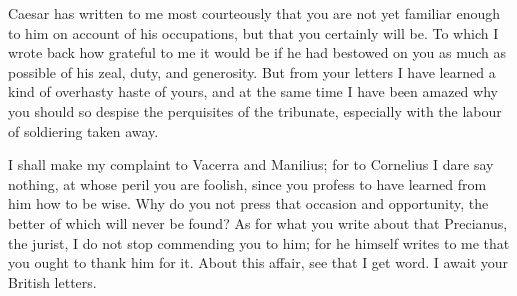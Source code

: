 

 Caesar has written to me most courteously that you are not yet familiar enough to him on account of his occupations, but that you certainly will be. To which I wrote back how grateful to me it would be if he had bestowed on you as much as possible of his zeal, duty, and generosity. But from your letters I have learned a kind of overhasty haste of yours, and at the same time I have been amazed why you should so despise the perquisites of the tribunate, especially with the labour of soldiering taken away.

 I shall make my complaint to Vacerra and Manilius; for to Cornelius I dare say nothing, at whose peril you are foolish, since you profess to have learned from him how to be wise. Why do you not press that occasion and opportunity, the better of which will never be found? As for what you write about that Precianus, the jurist, I do not stop commending you to him; for he himself writes to me that you ought to thank him for it. About this affair, see that I get word. I await your British letters.
